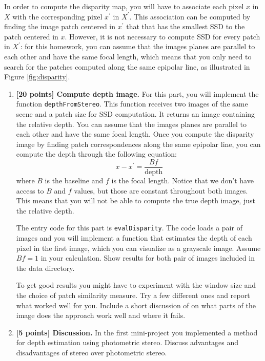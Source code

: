 \documentclass[10pt,letterpaper]{article}
\newcommand{\cmd}[1] {{\color{blue}\texttt{#1}}}
\begin{document}
In order to compute the disparity map, you will have to associate each pixel $x$ in $X$ with the corresponding
pixel $x^\prime$ in $X^\prime$.
This association can be computed by finding the image patch centered in $x^\prime$ that that has the smallest SSD
to the patch centered in $x$.
However, it is not necessary to compute SSD for every patch in $X^\prime$:
for this homework, you can assume that the images planes are parallel to each other and have the same focal length,
which means that you only need to search for the patches computed along the same epipolar line,
as illustrated in Figure \ref{fig:disparity}.

\begin{enumerate}
\item \textbf{[20 points] Compute depth image.}
For this part, you will implement the function \cmd{depthFromStereo}.
This function receives two images of the same scene and a patch size for SSD computation.
It returns an image containing the relative depth.
You can assume that the images planes are parallel to each other and have the same focal length.
Once you compute the disparity image by finding patch correspondences along the same epipolar line,
you can compute the depth through the following equation:
\begin{equation}
x-x^\prime = \frac{B f}{\text{depth}}
\end{equation}
where $B$ is the baseline and $f$ is the focal length. Notice that we don't have access to $B$ and $f$ values,
but those are constant throughout both images.
This means that you will not be able to compute the true depth image,
just the relative depth.

The entry code for this part is \cmd{evalDisparity}. The code loads a pair of images and you will implement a function that estimates the depth of each pixel in the first image, which you can visualize as a grayscale image. Assume $Bf = 1$ in your calculation. Show results for both pair of images included in the data directory. 

To get good results you might have to experiment with the window size and the choice of patch similarity measure. Try a few different ones and report what worked well for you. Include a short discussion of on what parts of the image does the approach work well and where it fails.

\item \textbf{[5 points] Discussion.}
In the first mini-project you implemented a method for depth estimation using photometric stereo.
Discuss advantages and disadvantages of stereo over photometric stereo.


\end{enumerate}
\end{document}
